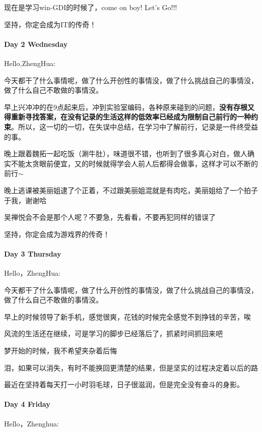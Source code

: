 \documentclass[UTF8,a4paper,8pt]{ctexart}
\begin{document}
      现在是学习win-GDI的时候了，come on boy! Let's Go!!!
      
      坚持，你定会成为IT的传奇！
      
      \paragraph{Day 2  Wednesday \  \ }Hello,ZhengHua:
      
      今天都干了什么事情呢，做了什么开创性的事情没，做了什么挑战自己的事情没，做了什么自己不敢做的事情没。
      
      早上兴冲冲的在9点起来后，冲到实验室编码，各种原来碰到的问题，\textbf{没有存根又得重新寻找答案，在没有记录的生活这样的低效率已经成为限制自己前行的一种约束}。所以，这一切的一切，在失误中总结，在学习中了解前行，记录是一件终受益的事。
      
      晚上跟着魏拓一起吃饭（涮牛肚），味道很不错，也听到了很多真心对白，做人确实不能太贪眼前便宜，又的时候就得学会人前人后都得会做事，这样才可以不断的前行$\sim$
      
      晚上逃课被美丽姐逮了个正着，不过跟美丽姐混就是有肉吃，美丽姐给了一个拍子于我，谢谢哈
      
      吴禅悦会不会是那个人呢？不要急，先看看，不要再犯同样的错误了
      
       坚持，你定会成为游戏界的传奇！
      \paragraph{Day 3  Thursday  \  \ }
      Hello，ZhengHua:
      
       今天都干了什么事情呢，做了什么开创性的事情没，做了什么挑战自己的事情没，做了什么自己不敢做的事情没。
       
       早上的时候领导了新手机，感觉很爽，花钱的时候完全感觉不到挣钱的辛苦，唉
       
       风流的生活还在继续，可是学习的脚步已经落后了，抓紧时间抓回来吧
       
       梦开始的时候，我不希望夹杂着后悔
       
       泪，如果可以消失，有时不能换回更清楚的结果，但是坚实的过程决定着以后的路
       
       最近在坚持着每天打一小时羽毛球，日子很滋润，但是完全没有奋斗的身影。
      
      \paragraph{Day 4  Friday  \  \ }
       Hello，Zhenghua:
      
\end{document}

